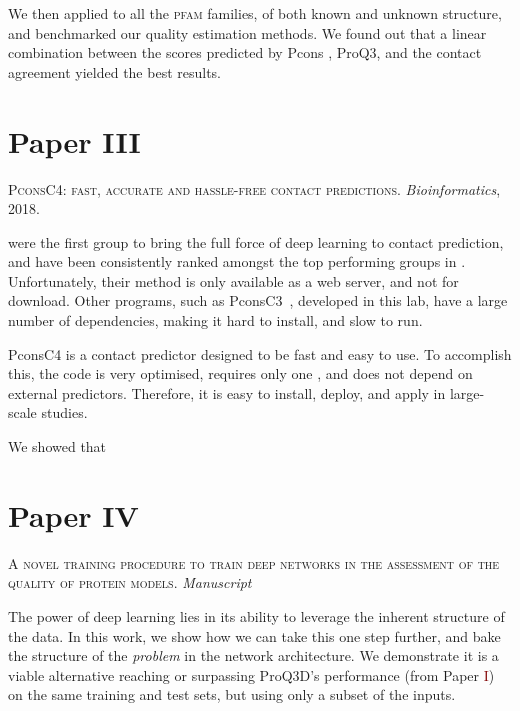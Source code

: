 We then applied to all the \textsc{pfam} families, of both known and unknown structure, and benchmarked our quality estimation methods.
We found out that a linear combination between the scores predicted by Pcons \citep{pcons}, ProQ3, and the contact agreement yielded the best results.

\newpage

\section*{Paper \textcolor[cmyk]{0, 0.87, 0.68, 0.32}{III}}
\begin{center}
	\textsc{PconsC4: fast, accurate and hassle-free contact predictions.}
	\emph{Bioinformatics}, 2018.
\end{center}

\noindent
\citet{ultra_deep_contacts} were the first group to bring the full force of deep learning to contact prediction, and have been consistently ranked amongst the top performing groups in \CASP.
Unfortunately, their method is only available as a web server, and not for download.
Other programs, such as PconsC3~\citet{PconsC3}, developed in this lab, have a large number of dependencies, making it hard to install, and slow to run.

PconsC4 is a contact predictor designed to be fast and easy to use.
To accomplish this, the code is very optimised, requires only one \MSA, and does not depend on external predictors.
Therefore, it is easy to install, deploy, and apply in large-scale studies.

We showed that


\section*{Paper \textcolor[cmyk]{0, 0.87, 0.68, 0.32}{IV}}
\begin{center}
	\textsc{A novel training procedure to train deep networks in the assessment of the quality of protein models.}
	\emph{Manuscript}
\end{center}

\noindent
The power of deep learning lies in its ability to leverage the inherent structure of the data.
In this work, we show how we can take this one step further, and bake the structure of the \emph{problem} in the network architecture.
We demonstrate it is a viable alternative reaching or surpassing ProQ3D's performance (from Paper \textcolor{Maroon}{I}) on the same training and test sets, but using only a subset of the inputs.

